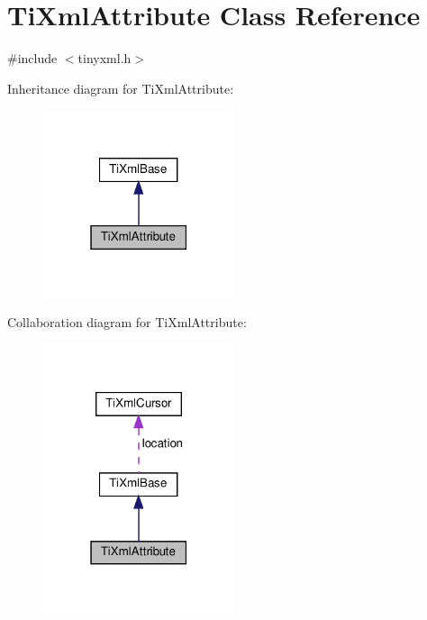 \hypertarget{classTiXmlAttribute}{}\section{Ti\+Xml\+Attribute Class Reference}
\label{classTiXmlAttribute}


{\ttfamily \#include $<$tinyxml.\+h$>$}



Inheritance diagram for Ti\+Xml\+Attribute\+:
\nopagebreak
\begin{figure}[H]
\begin{center}
\leavevmode
\includegraphics[width=159pt]{classTiXmlAttribute__inherit__graph}
\end{center}
\end{figure}


Collaboration diagram for Ti\+Xml\+Attribute\+:
\nopagebreak
\begin{figure}[H]
\begin{center}
\leavevmode
\includegraphics[width=159pt]{classTiXmlAttribute__coll__graph}
\end{center}
\end{figure}
